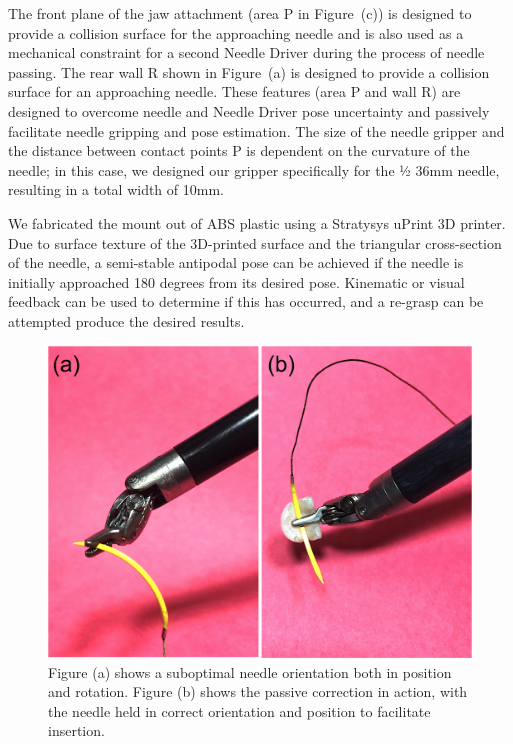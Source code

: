 \documentclass[0-suturing.tex]{subfiles}
\begin{document}
The front plane of the jaw attachment (area P  in Figure~(c)) is designed to provide a collision surface for the approaching needle and is also used as a mechanical constraint for a second Needle Driver during the process of needle passing. The rear wall R shown in Figure~(a)  is designed to provide a collision surface for an approaching needle. These features (area P and wall R) are designed to overcome needle and Needle Driver pose uncertainty and passively facilitate needle gripping and pose estimation. The size of the needle gripper and the distance between contact points P is dependent on the curvature of the needle; in this case, we designed our gripper specifically for the ½ 36mm needle, resulting in a total width of 10mm.

We fabricated the mount out of ABS plastic using a Stratysys uPrint 3D printer. Due to surface texture of the $3$D-printed surface and the triangular cross-section of the needle, a semi-stable antipodal pose can be achieved if the needle is initially approached 180 degrees from its desired pose. Kinematic or visual feedback can be used to determine if this has occurred, and a re-grasp can be attempted produce the desired results.


\begin{figure}[t!]
\centering
\includegraphics[width=0.95\linewidth]{figures/gripperAttachment}
\caption{Figure (a) shows a suboptimal needle orientation both in position and rotation. Figure (b) shows the passive correction in action, with the needle held in correct orientation and position to facilitate insertion. }
\label{fig:jawMount}
\vspace{-10pt}
\end{figure}
\end{document}
